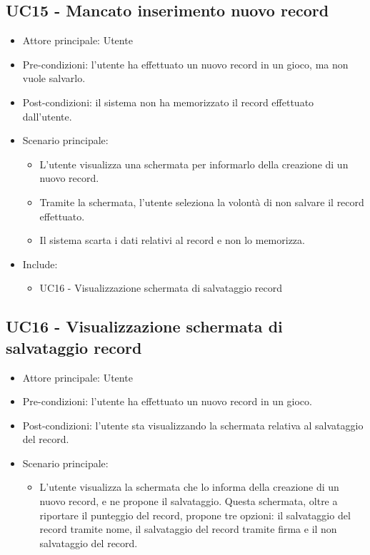\subsection{UC15 - Mancato inserimento nuovo record}
\begin{itemize}
    \item Attore principale: Utente
    \item Pre-condizioni: l'utente ha effettuato un nuovo record in un gioco, ma non vuole salvarlo.
    \item Post-condizioni: il sistema non ha memorizzato il record effettuato dall'utente.
    \item Scenario principale: \begin{itemize}
        \item L'utente visualizza una schermata per informarlo della creazione di un nuovo record.
        \item Tramite la schermata, l'utente seleziona la volontà di non salvare il record effettuato.
        \item Il sistema scarta i dati relativi al record e non lo memorizza.
    \end{itemize}
    \item Include: \begin{itemize}
        \item UC16 - Visualizzazione schermata di salvataggio record
    \end{itemize}
\end{itemize}

\subsection{UC16 - Visualizzazione schermata di salvataggio record}
\begin{itemize}
    \item Attore principale: Utente
    \item Pre-condizioni: l'utente ha effettuato un nuovo record in un gioco.
    \item Post-condizioni: l'utente sta visualizzando la schermata relativa al salvataggio del record.
    \item Scenario principale: \begin{itemize}
        \item L'utente visualizza la schermata che lo informa della creazione di un nuovo record, e ne propone il salvataggio. Questa schermata, oltre a riportare il punteggio del record, propone tre opzioni: il salvataggio del record tramite nome, il salvataggio del record tramite firma e il non salvataggio del record.
    \end{itemize}
\end{itemize}

